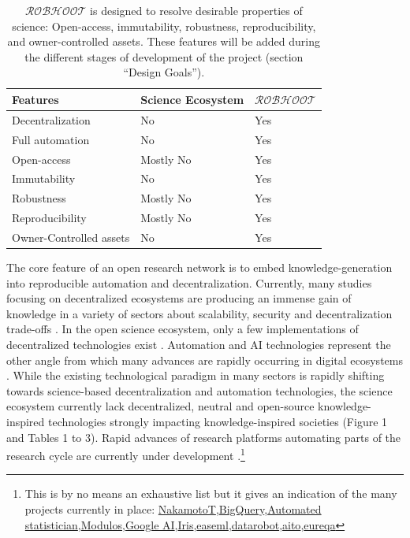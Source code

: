 \documentclass[12pt, a4paper]{article} %
\begin{document}
 
\begin{table}
\begin{tabular}{ p{6cm} | p{3cm} | p{3cm}}
  \hline \hline
  \textbf{Features} & \textbf{Science Ecosystem} &\textbf{{\bf $\mathcal{ROBHOOT}$}}\\  \hline
  Decentralization & No & Yes \\ \hline
  Full automation & No & Yes \\ \hline
  Open-access & Mostly No & Yes \\ \hline
  Immutability & No & Yes \\ \hline
  Robustness & Mostly No & Yes \\ \hline
  Reproducibility & Mostly No & Yes \\ \hline        
  Owner-Controlled assets & No & Yes \\ \hline       
  \bottomrule
\end{tabular}
\caption{{\bf $\mathcal{ROBHOOT}$} is designed to resolve desirable
  properties of science: Open-access, immutability, robustness,
  reproducibility, and owner-controlled assets. These features will be
  added during the different stages of development of the project
  (section ``Design Goals'').}
\end{table}
The core feature of an open research network is to embed
knowledge-generation into reproducible automation and
decentralization. Currently, many studies focusing on decentralized
ecosystems are producing an immense gain of knowledge in a variety of
sectors about scalability, security and decentralization trade-offs
\citep{Golem2016,Durov2017,Androulaki2018,OceanProtocolFoundation2018,BigchainDBGmbH2018}. In
the open science ecosystem, only a few implementations of
decentralized technologies exist \citep{Gunther2018}. Automation and
AI technologies represent the other angle from which many advances are
rapidly occurring in digital ecosystems
\citep{Schmidhuber:2015,Reichstein,Gil2019}. While the existing
technological paradigm in many sectors is rapidly shifting towards
science-based decentralization and automation technologies, the
science ecosystem currently lack decentralized, neutral and
open-source knowledge-inspired technologies strongly impacting
knowledge-inspired societies (Figure 1 and Tables 1 to 3). Rapid
advances of research platforms automating parts of the research cycle
are currently under development
\citep{Steinruecken,Guimera}.\footnote{This is by no means an
  exhaustive list but it gives an indication of the many projects
  currently in place:
  \href{https://www.nterminal.com}{NakamotoT},\href{https://cloud.google.com/bigquery/}{BigQuery},\href{https://www.automaticstatistician.com/index/}{Automated
    statistician},\href{http://www.modulos.ai/}{Modulos},\href{https://ai.google/}{Google
    AI},\href{https://iris.ai}{Iris},\href{https://github.com/DS3Lab/easeml}{easeml},\href{https://www.datarobot.com/}{datarobot},\href{https://aito.ai/}{aito},\href{https://www.nutonian.com/products/eureqa/}{eureqa}}
\end{document}
